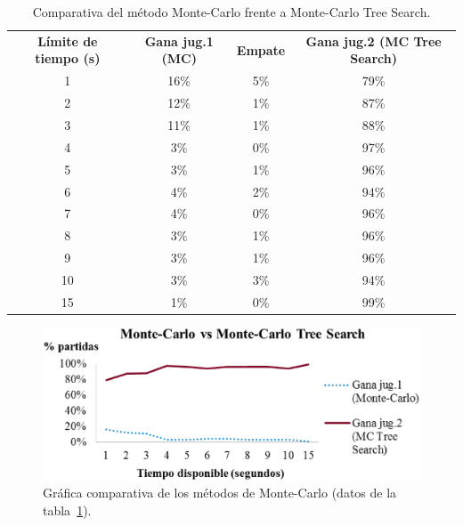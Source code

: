 \begin{table}[!h]
\centering
\caption[Comparativa de los métodos de Monte-Carlo (I)]{Comparativa del método Monte-Carlo frente a Monte-Carlo Tree Search.}
\label{tab:comparativa_montecarlo1}
\begin{tabular}{cccc}
\hline
\textbf{Límite de tiempo (s)} & \textbf{Gana jug.1 (MC)} & \textbf{Empate} & \textbf{Gana jug.2 (MC Tree Search)}\\
1 & 16\% &	5\% &	79\% \\
2 & 12\% &	1\% &	87\% \\
3 & 11\% &	1\% &	88\% \\
4 & 3\% &	0\% &	97\%  \\
5 & 3\% &	1\% &	96\%  \\
6 & 4\% &	2\% &	94\%  \\
7 & 4\% &	0\% &	96\%  \\
8 & 3\% &	1\% &	96\% \\
9 & 3\% &	1\% &	96\%  \\
10 & 3\% &	3\% &	94\% \\
15 & 1\% &	0\% &	99\% \\
\hline
\end{tabular}
\end{table} 

\begin{figure}[!h]
	\centering
	\includegraphics[scale=0.4]{contenido/cap7/imagenes/montecarlo1.eps}
	\caption[Comparativa de los métodos de Monte-Carlo (I)]{Gráfica comparativa de los métodos de Monte-Carlo (datos de la tabla~\ref{tab:comparativa_montecarlo1}).}
	\label{fig:comparativa_montecarlo1}
\end{figure} 

